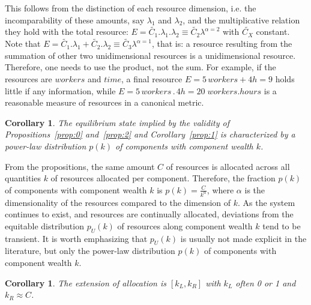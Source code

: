 \documentclass[10pt,letterpaper]{article}
\newtheorem{corollary}[theorem2]{Corollary}
\begin{document}
%

This follows from the distinction of each resource dimension,
i.e. the incomparability of these amounts, say $\lambda_1$ and $\lambda_2$, and the multiplicative relation they hold with the total resource: $E=\widetilde{C_1} . \lambda_1 . \lambda_2 \equiv \widetilde{C_2}\lambda^{\alpha=2}$
with $\widetilde{C_X}$ constant.
Note that $E=\widetilde{C_1} . \lambda_1 + \widetilde{C_2}.\lambda_2 \equiv \widetilde{C_3}\lambda^{\alpha=1}$, that is: a resource resulting from the summation of other two unidimensional resources is a unidimensional resource. Therefore, one needs to use the product, not the sum. For example, if the resources are $workers$ and $time$,
a final resource $E=5\, workers + 4h=9$
holds little if any information, while
$E= 5\, workers \, . \, 4 h= 20\; workers . hours$ is
a reasonable measure of resources in a canonical metric.

\begin{corollary}\label{prop:3}
	The equilibrium state implied by the validity of Propositions~\ref{prop:0} and~\ref{prop:2} and Corollary~\ref{prop:1} is characterized by a power-law distribution $p(k)$ of components with component wealth $k$.
\end{corollary}

From the propositions, the same amount $C$ of resources is allocated
across all quantities $k$ of resources allocated per component.
Therefore, the fraction $p(k)$ of components with component wealth $k$ is
$p(k)=\frac{C}{k^\alpha}$, where $\alpha$ is
the dimensionality of the resources compared to the dimension of $k$.
As the system continues to exist,
and resources are continually allocated, deviations from the equitable distribution $p_U(k)$ of resources along component wealth $k$  tend to be transient. It is worth emphasizing that $p_U(k)$ is usually not made explicit in the literature, but only
 the power-law distribution $p(k)$ of components
with component wealth $k$.

\begin{corollary}\label{cor:2}
	The extension of allocation is $[k_L,k_R]$ with $k_L$ often 0 or 1 and $k_R\approx C$.
\end{corollary}
\end{document}
